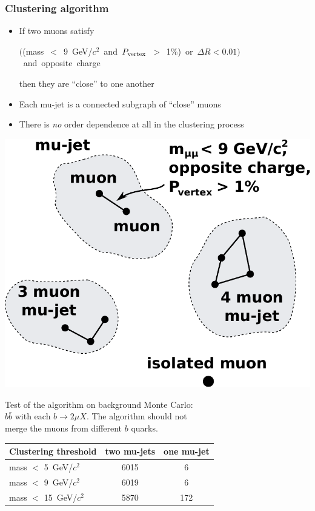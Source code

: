 \documentclass[compress]{beamer}
\newcommand{\s}[1]{{\mbox{\scriptsize #1}}}
\begin{document}
\begin{frame}
\frametitle{Clustering algorithm}

\begin{itemize}
\item If two muons satisfy

\mbox{\hspace{-1 cm}$\bigg($(mass $<$ 9~GeV/$c^2$ and $P_\s{vertex}$ $>$ 1\%) or $\Delta R < 0.01$$\bigg)$ and opposite charge\hspace{-1 cm}}

then they are ``close'' to one another

\item Each mu-jet is a connected subgraph of ``close'' muons

\item There is {\it no} order dependence at all in the clustering process
\end{itemize}

\hfill \includegraphics[width=0.37\linewidth]{closeness.pdf}

\vspace{-3 cm}
\scriptsize
Test of the algorithm on background Monte Carlo: \\ $b\bar{b}$ with each
$b \to 2\mu X$.  The algorithm should not \\ merge the muons from
different $b$ quarks.

\vspace{0.25 cm}
\renewcommand{\arraystretch}{1.3}
\begin{tabular}{l c c}
Clustering threshold & two mu-jets & one mu-jet \\\hline
mass $<$ 5~GeV/$c^2$ & 6015 & 6 \\
mass $<$ 9~GeV/$c^2$ & 6019 & 6 \\
mass $<$ 15~GeV/$c^2$ & 5870 & 172
\end{tabular}
\end{frame}
\end{document}
